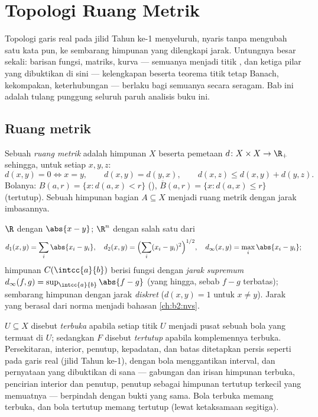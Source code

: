 \chapter{Topologi Ruang Metrik}\label{ch:b2:metric}

Topologi garis real pada jilid Tahun ke-1 menyeluruh, nyaris
tanpa mengubah satu kata pun, ke sembarang himpunan yang dilengkapi
jarak. Untungnya besar sekali: barisan fungsi, matriks, kurva --- semuanya
menjadi titik , dan ketiga pilar yang dibuktikan di sini
--- kelengkapan beserta teorema titik tetap Banach, kekompakan,
keterhubungan --- berlaku bagi semuanya secara seragam. Bab ini adalah
tulang punggung seluruh paruh analisis buku ini.

\section{Ruang metrik}

\begin{definition}\label{def:b2:metric:def}
Sebuah \emph{ruang metrik} adalah himpunan $X$ beserta
pemetaan $d \colon X \times X \to \R_+$ sehingga, untuk setiap $x, y, z$:
\[
d(x,y) = 0 \iff x = y,
\qquad
d(x,y) = d(y,x),
\qquad
d(x,z) \leq d(x,y) + d(y,z).
\]
Bolanya: $B(a, r) = \{x : d(a,x) < r\}$ (), $\overline B(a,r) =
\{x : d(a,x) \leq r\}$ (tertutup). Sebuah himpunan bagian $A \subseteq X$
menjadi ruang metrik dengan jarak imbasannya.
\end{definition}

\begin{example}\label{ex:b2:metric:examples}
$\R$ dengan $\abs{x - y}$; $\R^n$ dengan salah satu dari
\[
d_1(x,y) = \sum_i \abs{x_i - y_i},
\quad
d_2(x,y) = \Bigl(\sum_i (x_i - y_i)^2\Bigr)^{1/2},
\quad
d_\infty(x,y) = \max_i \abs{x_i - y_i};
\]
himpunan $C(\intcc{a}{b})$ berisi fungsi  dengan
\emph{jarak supremum} $d_\infty(f, g) = \sup_{\intcc{a}{b}} \abs{f -
g}$ (yang hingga, sebab $f - g$ terbatas); sembarang himpunan dengan
jarak \emph{diskret} ($d(x,y) = 1$ untuk $x \neq y$). Jarak yang berasal
dari norma menjadi bahasan \cref{ch:b2:nvs}.
\end{example}

\begin{definition}\label{def:b2:metric:topology}
$U \subseteq X$ disebut \emph{terbuka}
apabila setiap titik $U$ menjadi pusat sebuah bola yang termuat di $U$;
sedangkan $F$ disebut \emph{tertutup} apabila komplemennya terbuka.
Persekitaran, interior, penutup, kepadatan, dan batas ditetapkan persis
seperti pada garis real (jilid Tahun ke-1), dengan bola menggantikan
interval, dan pernyataan yang dibuktikan di sana --- gabungan dan irisan
himpunan terbuka, pencirian interior dan penutup, penutup sebagai
himpunan tertutup terkecil yang memuatnya --- berpindah dengan bukti yang
sama. Bola terbuka memang terbuka, dan bola tertutup memang tertutup
(lewat ketaksamaan segitiga).
\end{definition}

